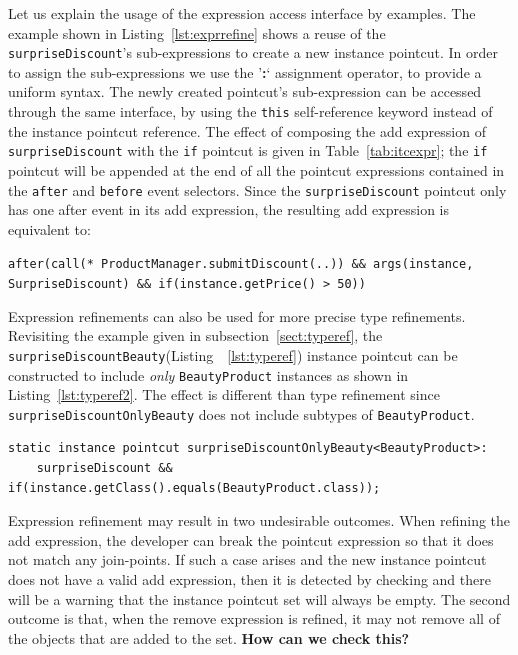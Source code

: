 \documentclass{acm_proc_article-sp}
\newcommand{\lstinln}[1]{\lstinline~#1~}
\begin{document}
Let us explain the usage of the expression access interface by examples. The example shown in Listing~\ref{lst:exprrefine} shows a reuse of the \lstinln{surpriseDiscount}'s sub-expressions to create a new instance pointcut. In order to assign the sub-expressions we use the '\textbf{\textsf{:}}` assignment operator, to provide a uniform syntax. The newly created pointcut's sub-expression can be accessed through the same interface, by using the \lstinln{this} self-reference keyword instead of the instance pointcut reference. The effect of composing the add expression of \texttt{surpriseDiscount} with the \lstinln{if} pointcut is given in Table~\ref{tab:itcexpr}; the \lstinln{if} pointcut will be appended at the end of all the pointcut expressions contained in the \texttt{after} and \lstinln{before} event selectors. Since the  \lstinln{surpriseDiscount} pointcut only has one after event in its add expression, the resulting add expression is equivalent to: 

\lstinln{after(call(* ProductManager.submitDiscount(..)) && args(instance, SurpriseDiscount) && if(instance.getPrice() > 50))}

Expression refinements can also be used for more precise type refinements. Revisiting the example given in subsection~\ref{sect:typeref}, the \lstinln{surpriseDiscountBeauty}(Listing~~\ref{lst:typeref}) instance pointcut can be constructed to include \emph{only} \lstinln{BeautyProduct} instances as shown in Listing~\ref{lst:typeref2}. The effect is different than type refinement since \lstinln{surpriseDiscountOnlyBeauty} does not include subtypes of \lstinln{BeautyProduct}. 

\begin{lstlisting}[float=h!,caption={Type refinement by expression refinement}, label={lst:typeref2}]
static instance pointcut surpriseDiscountOnlyBeauty<BeautyProduct>: 
	surpriseDiscount && if(instance.getClass().equals(BeautyProduct.class));
\end{lstlisting}

Expression refinement may result in two undesirable outcomes. When refining the add expression, the developer can break the pointcut expression so that it does not match any join-points. If such a case arises and the new instance pointcut does not have a valid add expression, then it is detected by checking and there will be a warning that the instance pointcut set will always be empty. The second outcome is that, when the remove expression is refined, it may not remove all of the objects that are added to the set. \textbf{How can we check this?}
\end{document}
